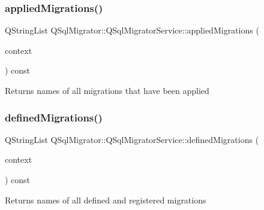\subsubsection{\texorpdfstring{applied\+Migrations()}{appliedMigrations()}}
{\footnotesize\ttfamily Q\+String\+List Q\+Sql\+Migrator\+::\+Q\+Sql\+Migrator\+Service\+::applied\+Migrations (\begin{DoxyParamCaption}\item[{const \hyperlink{class_q_sql_migrator_1_1_migration_execution_1_1_migration_execution_context}{Migration\+Execution\+::\+Migration\+Execution\+Context} \&}]{context }\end{DoxyParamCaption}) const}

\begin{DoxyReturn}{Returns}
names of all migrations that have been applied 
\end{DoxyReturn}
\mbox{\label{class_q_sql_migrator_1_1_q_sql_migrator_service_a95540ad297027ab2d746d5d67a42f51a}} 
\subsubsection{\texorpdfstring{defined\+Migrations()}{definedMigrations()}}
{\footnotesize\ttfamily Q\+String\+List Q\+Sql\+Migrator\+::\+Q\+Sql\+Migrator\+Service\+::defined\+Migrations (\begin{DoxyParamCaption}\item[{const \hyperlink{class_q_sql_migrator_1_1_migration_execution_1_1_migration_execution_context}{Migration\+Execution\+::\+Migration\+Execution\+Context} \&}]{context }\end{DoxyParamCaption}) const}

\begin{DoxyReturn}{Returns}
names of all defined and registered migrations 
\end{DoxyReturn}
\mbox{\label{class_q_sql_migrator_1_1_q_sql_migrator_service_ab260bfc218f0a6c58eae3c261c6ea462}} 
